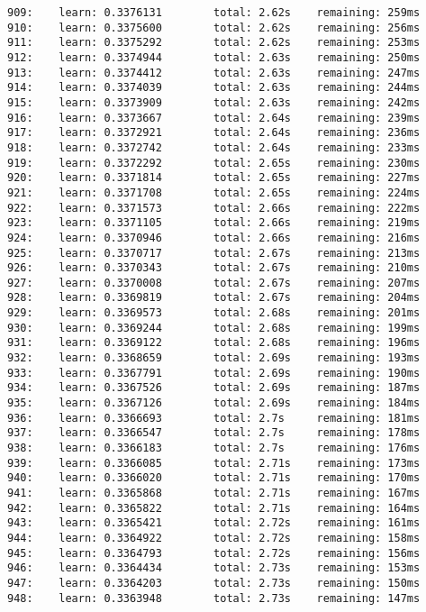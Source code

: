 \documentclass[11pt]{article}
\begin{document}
\begin{Verbatim}[commandchars=\\\{\}]
909:    learn: 0.3376131        total: 2.62s    remaining: 259ms
910:    learn: 0.3375600        total: 2.62s    remaining: 256ms
911:    learn: 0.3375292        total: 2.62s    remaining: 253ms
912:    learn: 0.3374944        total: 2.63s    remaining: 250ms
913:    learn: 0.3374412        total: 2.63s    remaining: 247ms
914:    learn: 0.3374039        total: 2.63s    remaining: 244ms
915:    learn: 0.3373909        total: 2.63s    remaining: 242ms
916:    learn: 0.3373667        total: 2.64s    remaining: 239ms
917:    learn: 0.3372921        total: 2.64s    remaining: 236ms
918:    learn: 0.3372742        total: 2.64s    remaining: 233ms
919:    learn: 0.3372292        total: 2.65s    remaining: 230ms
920:    learn: 0.3371814        total: 2.65s    remaining: 227ms
921:    learn: 0.3371708        total: 2.65s    remaining: 224ms
922:    learn: 0.3371573        total: 2.66s    remaining: 222ms
923:    learn: 0.3371105        total: 2.66s    remaining: 219ms
924:    learn: 0.3370946        total: 2.66s    remaining: 216ms
925:    learn: 0.3370717        total: 2.67s    remaining: 213ms
926:    learn: 0.3370343        total: 2.67s    remaining: 210ms
927:    learn: 0.3370008        total: 2.67s    remaining: 207ms
928:    learn: 0.3369819        total: 2.67s    remaining: 204ms
929:    learn: 0.3369573        total: 2.68s    remaining: 201ms
930:    learn: 0.3369244        total: 2.68s    remaining: 199ms
931:    learn: 0.3369122        total: 2.68s    remaining: 196ms
932:    learn: 0.3368659        total: 2.69s    remaining: 193ms
933:    learn: 0.3367791        total: 2.69s    remaining: 190ms
934:    learn: 0.3367526        total: 2.69s    remaining: 187ms
935:    learn: 0.3367126        total: 2.69s    remaining: 184ms
936:    learn: 0.3366693        total: 2.7s     remaining: 181ms
937:    learn: 0.3366547        total: 2.7s     remaining: 178ms
938:    learn: 0.3366183        total: 2.7s     remaining: 176ms
939:    learn: 0.3366085        total: 2.71s    remaining: 173ms
940:    learn: 0.3366020        total: 2.71s    remaining: 170ms
941:    learn: 0.3365868        total: 2.71s    remaining: 167ms
942:    learn: 0.3365822        total: 2.71s    remaining: 164ms
943:    learn: 0.3365421        total: 2.72s    remaining: 161ms
944:    learn: 0.3364922        total: 2.72s    remaining: 158ms
945:    learn: 0.3364793        total: 2.72s    remaining: 156ms
946:    learn: 0.3364434        total: 2.73s    remaining: 153ms
947:    learn: 0.3364203        total: 2.73s    remaining: 150ms
948:    learn: 0.3363948        total: 2.73s    remaining: 147ms

\end{Verbatim}
\end{document}

